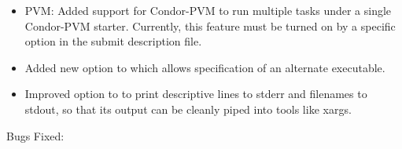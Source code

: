 \begin{itemize}
\item PVM: Added support for Condor-PVM to run multiple tasks under a single
	Condor-PVM starter. Currently, this feature must be turned on
	by a specific option in the submit description file.

\item Added new option  to  which allows 
specification of an alternate  executable. 

\item Improved  option to  to print
      descriptive lines to stderr and filenames to stdout, so that its
      output can be cleanly piped into tools like xargs.

\end{itemize}

\noindent Bugs Fixed:

